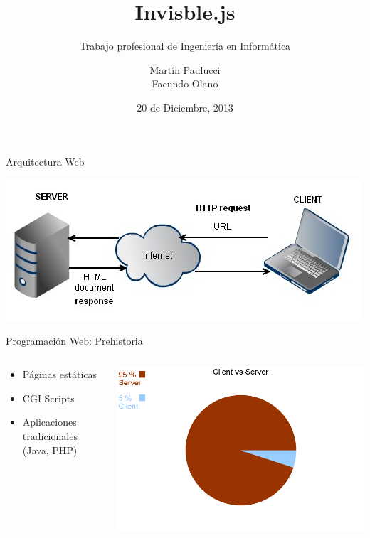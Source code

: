 \documentclass[xcolor=dvipsnames, 14pt]{beamer}
\title{Invisble.js}
\subtitle{Trabajo profesional de Ingeniería en Informática}
\author{
Martín Paulucci \\
Facundo Olano
}
\institute[UMBC]{
  Facultad de Ingeniería\\
  Universidad de Buenos Aires \\
}
\date{20 de Diciembre, 2013}
\begin{document}
\begin{frame}[plain]
  \titlepage
\end{frame}

\begin{frame}{Arquitectura Web}
    \begin{center}
        \includegraphics[width=\textwidth]{img/http.png}
    \end{center}
\end{frame}


\begin{frame}{Programación Web: Prehistoria}
    \begin{columns}
        \begin{column}{0.4\textwidth}
            \begin{itemize}
                \item Páginas estáticas
                \item CGI Scripts
                \item Aplicaciones tradicionales (Java, PHP)
            \end{itemize}
        \end{column}
        \begin{column}{0.6\textwidth}
            \begin{center}
                \includegraphics[width=\textwidth]{img/prehistoria.png}
            \end{center}
        \end{column}
    \end{columns}
\end{frame}
\end{document}
